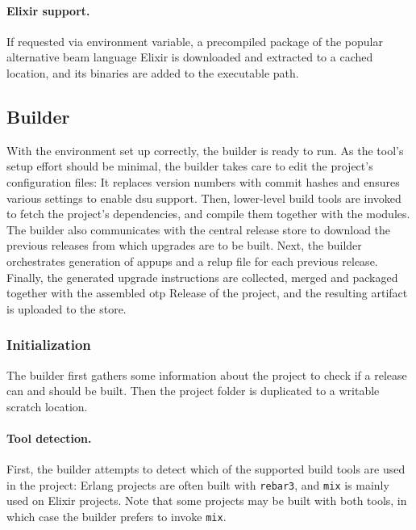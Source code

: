 \paragraph{Elixir support.} If requested via environment variable, a precompiled package of the popular alternative \acrshort{beam} language Elixir is downloaded and extracted to a cached location, and its binaries are added to the executable path.

\cleardoublepage
\subsection{Builder}

With the environment set up correctly, the builder is ready to run. As the tool's setup effort should be minimal, the builder takes care to edit the project's configuration files: It replaces version numbers with commit hashes and ensures various settings to enable \acrshort{dsu} support. Then, lower-level build tools are invoked to fetch the project's dependencies, and compile them together with the modules. The builder also communicates with the central release store to download the previous releases from which upgrades are to be built. Next, the builder orchestrates generation of \acrshort{appup}s and a \acrshort{relup} file for each previous release. Finally, the generated upgrade instructions are collected, merged and packaged together with the assembled \acrshort{otp} Release of the project, and the resulting artifact is uploaded to the store.

\subsubsection{Initialization}

The builder first gathers some information about the project to check if a release can and should be built. Then the project folder is duplicated to a writable scratch location.

\paragraph{Tool detection.} First, the builder attempts to detect which of the supported build tools are used in the project: Erlang projects are often built with \lstinline|rebar3|, and \lstinline|mix| is mainly used on Elixir projects. Note that some projects may be built with both tools, in which case the builder prefers to invoke \lstinline|mix|.

